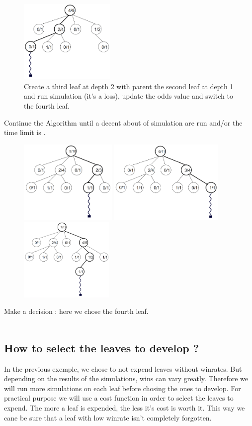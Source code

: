 \documentclass[12pt]{article}
\begin{document}
\begin{figure}[H]
\centering
\includegraphics[height=4cm]{img/9.png}
\caption{\label{fig:9}Create a third leaf at depth 2 with parent the second leaf at depth 1 and run simulation (it's a loss), update the odds value and switch to the fourth leaf.}
\end{figure}
\noindent
Continue the Algorithm until a decent about of simulation are run and/or the time limit is .
\begin{figure}[H]
\includegraphics[height=4cm]{img/10.png}
\includegraphics[height=4cm]{img/11.png}
\includegraphics[height=4cm]{img/12.png}
\end{figure}
\noindent
Make a decision : here we chose the fourth leaf.\\
\\
\subsection{How to select the leaves to develop ?}
In the previous exemple, we chose to not expend leaves without winrates. But depending on the results of the simulations, wins can vary greatly. Therefore we will run more simulations on each leaf before chosing the ones to develop. For practical purpose we will use a cost function in order to select the leaves to expend. The more a leaf is expended, the less it's cost is worth it. This way we cane be sure that a leaf with low winrate isn't completely forgotten. 
\end{document}
